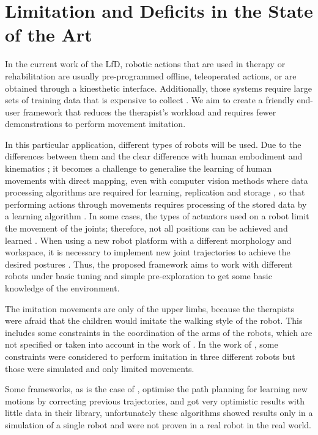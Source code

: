 \documentclass[thesis]{mas_proposal}
\begin{document}
\section{Limitation and Deficits in the State of the Art}
    
    In the current work of the LfD, robotic actions that are used in therapy or rehabilitation are usually pre-programmed offline, teleoperated actions, or are obtained through a kinesthetic interface. Additionally, those systems require large sets of training data that is expensive to collect \cite{Dinyari2020, Yan2010, Mandlekar2018}. We aim to create a friendly end-user framework that reduces the therapist's workload and requires fewer demonstrations to perform movement imitation.
    
    In this particular application, different types of robots will be used. Due to the differences between them and the clear difference with human embodiment and kinematics \cite{Koenemann2012}; it becomes a challenge to generalise the learning of human movements with direct mapping, even with computer vision methods where data processing algorithms are required for learning, replication and storage \cite{Liu2015}, so that performing actions through movements requires processing of the stored data by a learning algorithm \cite{Kober2010}. In some cases, the types of actuators used on a robot limit the movement of the joints; therefore, not all positions can be achieved and learned \cite{Almalki2020}. When using a new robot platform with a different morphology and workspace, it is necessary to implement new joint trajectories to achieve the desired postures \cite{VanPerre2015}. Thus, the proposed framework aims to work with different robots under basic tuning and simple pre-exploration to get some basic knowledge of the environment. 
    
    The imitation movements are only of the upper limbs, because the therapists were afraid that the children would imitate the walking style of the robot. This includes some constraints in the coordination of the arms of the robots, which are not specified or taken into account in the work of \cite{Liu2015, Fadli2018, Suleiman2008}. In the work of \cite{VanPerre2015}, some constraints were considered to perform imitation in three different robots but those were simulated and only limited movements.
    
    Some frameworks, as is the case of \cite{Berenson2012, Coleman2015}, optimise the path planning for learning new motions by correcting previous trajectories, and got very optimistic results with little data in their library, unfortunately these algorithms showed results only in a simulation of a single robot and were not proven in a real robot in the real world. 
    
\end{document}
